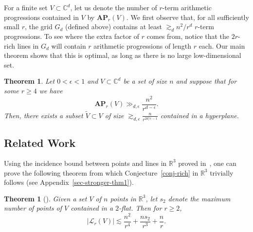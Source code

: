 \documentclass[11pt]{article}
\newtheorem{thm}{Theorem}[section]
\newtheorem{THM}{Theorem}
\def\L{{\mathcal L}}
\def\R{{\mathbb{R}}}
\def\C{{\mathbb{C}}}
\def\AP{{\mathbf{AP}}}
\newcommand{\eps}{\epsilon}
\begin{document}
For a finite set $V \subset \C^d$, let us denote the number of $r$-term arithmetic progressions contained in $V$ by $\AP_r(V)$. We first observe that, for all sufficiently small $r$, the grid $G_d$ (defined above) contains at least $\gtrsim_d n^2/r^d$ $r$-term progressions. To see where the extra factor of $r$ comes from, notice that the $2r$-rich lines in $G_d$ will contain $r$ arithmetic progressions of length $r$ each. Our main theorem shows that this is optimal, as long as there is no large low-dimensional set.
  
\begin{THM}\label{thm-apbound}
Let $0 < \epsilon < 1$ and $V \subset \C^d$ be a set of size $n$ and suppose that for some $r \geq 4$ we have $$ \AP_r(V) \gg_{d,\epsilon} \frac{n^2}{r^{d-\eps}}.$$ Then, there exists a subset $\tilde V \subset V$ of size $\gtrsim_{d,\epsilon} \frac{n}{r^{{2d/\eps}-1}}$  contained in a hyperplane.
\end{THM}


\subsection{Related Work}
Using the incidence bound between points and lines in $\R^3$ proved in~\cite{GK10}, one can prove the following theorem from which Conjecture~\ref{conj-rich} in $\R^3$ trivially follows (see Appendix~\ref{sec-stronger-thm1}).

\begin{thm}[\cite{GK10}]
\label{thm-conj-d=3}
Given a set $V$ of $n$ points in $\R^3$, let $s_2$ denote the maximum number of points of $V$ contained in a $2$-flat. Then for $r\ge 2$,
$$|\L_r(V)|\lesssim \frac{n^2}{r^4}+\frac{ns_2}{r^3}+\frac{n}{r}.$$
\end{thm}
\end{document}
